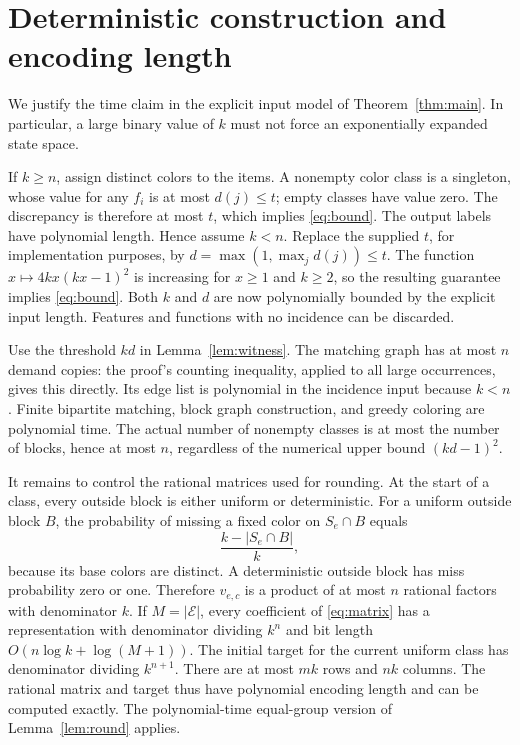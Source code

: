 \documentclass[acmsmall,11pt,nonacm]{acmart}
\newcommand{\calE}{\mathcal{E}}
\begin{document}
\section{Deterministic construction and encoding length}
\label{sec:algorithm}

We justify the time claim in the explicit input model of
Theorem~\ref{thm:main}. In particular, a large binary value of $k$ must not
force an exponentially expanded state space.

If $k\ge n$, assign distinct colors to the items. A nonempty color class
is a singleton, whose value for any $f_i$ is at most $d(j)\le t$; empty
classes have value zero. The discrepancy is therefore at most $t$, which
implies \eqref{eq:bound}. The output labels have polynomial length.
Hence assume $k<n$. Replace the supplied $t$, for implementation purposes,
by $d=\max(1,\max_j d(j))\le t$. The function
$x\mapsto4kx(kx-1)^2$ is increasing for $x\ge1$ and $k\ge2$, so the
resulting guarantee implies \eqref{eq:bound}. Both $k$ and $d$ are now
polynomially bounded by the explicit input length. Features and functions
with no incidence can be discarded.

Use the threshold $kd$ in Lemma~\ref{lem:witness}. The matching graph has
at most $n$ demand copies: the proof's counting inequality, applied to
all large occurrences, gives this directly. Its edge list is polynomial
in the incidence input because $k<n$. Finite bipartite matching, block
graph construction, and greedy coloring are polynomial time. The actual
number of nonempty classes is at most the number of blocks, hence at
most $n$, regardless of the numerical upper bound $(kd-1)^2$.

It remains to control the rational matrices used for rounding. At the
start of a class, every outside block is either uniform or deterministic.
For a uniform outside block $B$, the probability of missing a fixed
color on $S_e\cap B$ equals
\[
 \frac{k-|S_e\cap B|}{k},
\]
because its base colors are distinct. A deterministic outside block has
miss probability zero or one. Therefore $v_{e,c}$ is a product of at most
$n$ rational factors with denominator $k$. If $M=|\calE|$, every
coefficient of \eqref{eq:matrix} has a representation with denominator
dividing $k^n$ and bit length $O(n\log k+\log(M+1))$. The initial target
for the current uniform class has denominator dividing $k^{n+1}$.
There are at most $mk$ rows and $nk$ columns. The rational matrix and
target thus have polynomial encoding length and can be computed exactly.
The polynomial-time equal-group version of Lemma~\ref{lem:round} applies.
\end{document}
